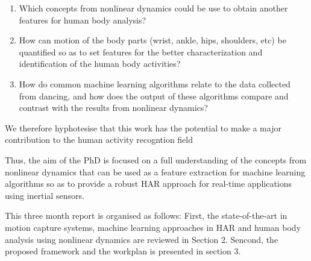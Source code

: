 \documentclass{sigchi}
\begin{document}
\begin{enumerate}
  \setlength{\itemsep}{0pt}
  \setlength{\parsep}{0pt}
  \item Which concepts from nonlinear dynamics could be use to obtain 
	another features for human body analysis?
  \item How can motion of the body parts (wrist, ankle, hips, shoulders, etc)
        be quantified so as to set features for the better characterization
        and identification of the human body activities?
  \item How do common machine learning algorithms relate to the data collected 
  from dancing, and how does the output of these algorithms compare and contrast 
  with the results from nonlinear dynamics?
\end{enumerate}

We therefore hyphotesise that this work has the potential to 
make a major contribution to the human activity recogntion field

Thus, the aim of the PhD is focused on a full understanding 
of the concepts from nonlinear dynamics that can be used 
as a feature extraction for machine learning algorithms so as to provide 
a robust HAR approach for real-time applications using inertial sensors.

This three month report is organised as follows: First,
the state-of-the-art in motion capture systems, machine learning approaches in HAR
and human body analysis using nonlinear dynamics are reviewed in Section 2. Sencond, 
the proposed framework and the workplan is presented in section 3.
\end{document}
